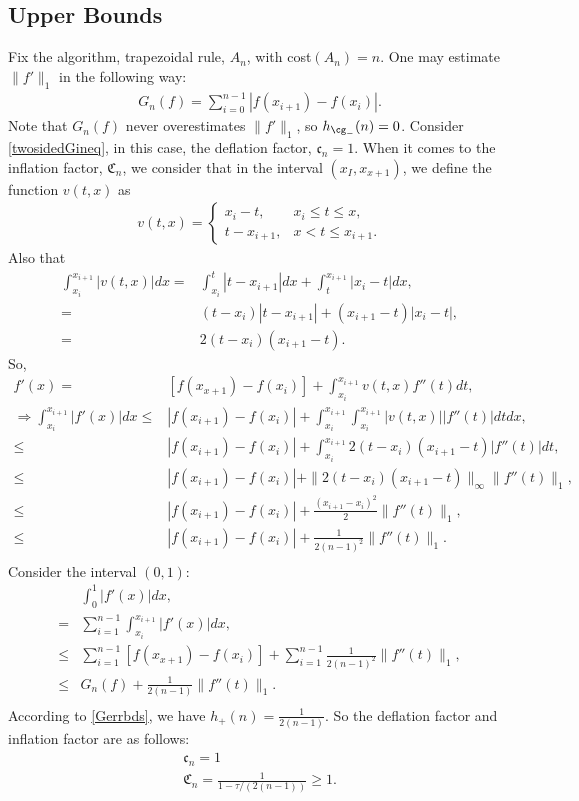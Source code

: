 \subsection{Upper Bounds}
 Fix the algorithm, trapezoidal rule, $A_n$, with cost$(A_n)=n$. One may estimate $\|f'\|_1$ in the following way:
 \begin{align}\label{1direst}
    G_n(f)=\sum_{i=0}^{n-1}\left|f(x_{i+1})-f(x_{i})\right|.
 \end{align} Note that $G_{n}(f)$ never overestimates $\|f'\|_{1}$, so $h_{\cg_{-}}(n)=0$. Consider \eqref{twosidedGineq}, in this case, the deflation factor, $\mathfrak{c}_n=1$. When it comes to the inflation factor, $\mathfrak{C}_n$, we consider that in the interval $(x_I,x_{x+1})$, we define the function $v(t,x)$ as
 \begin{align*}
   v(t,x)=\begin{cases}  \displaystyle  x_i-t, & x_i\leq t\leq x,\\[2ex]
 \displaystyle  t-x_{i+1}, & x< t \leq x_{i+1}.
\end{cases}
 \end{align*}
 Also that
 \begin{align*}
   \int_{x_i}^{x_{i+1}}|v(t,x)|dx=&\int_{x_i}^{t}|t-x_{i+1}|dx+\int_{t}^{x_{i+1}}|x_i-t|dx,\\
   =&(t-x_i)|t-x_{i+1}|+(x_{i+1}-t)|x_i-t|,\\
   =&2(t-x_i)(x_{i+1}-t).
 \end{align*}
 So,
 \begin{align*}
   f'(x)=&[f(x_{x+1})-f(x_{i})]+\int_{x_i}^{x_{i+1}}v(t,x)f''(t)dt,\\
   \Rightarrow \int_{x_i}^{x_{i+1}}|f'(x)|dx \leq & |f(x_{i+1})-f(x_i)|+\int_{x_i}^{x_{i+1}}\int_{x_i}^{x_{i+1}}|v(t,x)||f''(t)|dtdx,\\
   \leq & |f(x_{i+1})-f(x_i)|+\int_{x_i}^{x_{i+1}}2(t-x_i)(x_{i+1}-t)|f''(t)|dt,\\
   \leq & |f(x_{i+1})-f(x_i)|+\|2(t-x_i)(x_{i+1}-t)\|_{\infty}\|f''(t)\|_{1},\\
   \leq & |f(x_{i+1})-f(x_i)|+\frac{(x_{i+1}-x_{i})^2}{2}\|f''(t)\|_{1},\\
   \leq & |f(x_{i+1})-f(x_i)|+\frac{1}{2(n-1)^2}\|f''(t)\|_{1}.\\
 \end{align*}
 Consider the interval $(0,1)$:
 \begin{align*}
   &\int_{0}^{1}|f'(x)|dx,\\
   =&\sum_{i=1}^{n-1}\int_{x_i}^{x_{i+1}}|f'(x)|dx,\\
   \leq & \sum_{i=1}^{n-1}[f(x_{x+1})-f(x_{i})]+\sum_{i=1}^{n-1}\frac{1}{2(n-1)^2}\|f''(t)\|_{1},\\
   \leq & G_n(f)+\frac{1}{2(n-1)}\|f''(t)\|_{1}.\\
 \end{align*}
According to \eqref{Gerrbds}, we have $h_{+}(n)=\frac{1}{2(n-1)}$. So the deflation factor and inflation factor are as follows:
\begin{gather}\label{factor}
\mathfrak{c}_n =1 \\
\mathfrak{C}_n =\frac{1}{1 - \tau/(2(n-1))} \geq 1.
\end{gather}

